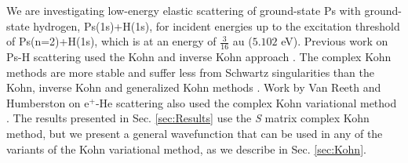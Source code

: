 \documentclass[preprint,showpacs,showkeys,preprintnumbers,amsmath,amssymb,longbibliography,pra,aps]{revtex4-1}
\begin{document}
We are investigating low-energy elastic scattering of ground-state Ps
with ground-state 
hydrogen, Ps(1s)+H(1s), for incident energies up to the excitation threshold 
of Ps(n=2)+H(1s), which is at an energy of $\tfrac{3}{16}$ au ($5.102$ eV). 
Previous work on Ps-H scattering used the Kohn and inverse Kohn approach
\cite{VanReeth2003, VanReeth2004}. The complex Kohn methods are more stable and
suffer less from Schwartz singularities than the Kohn, inverse Kohn and 
generalized Kohn methods \cite{Lucchese1989,Cooper2009,Cooper2010}. Work by 
Van Reeth and Humberston on e$^+$-He scattering also used the complex Kohn 
variational method \cite{VanReeth1999}. The results presented in Sec.
\ref{sec:Results} use the \emph{S} matrix complex Kohn method, but we present a
general wavefunction that can be used in any of the variants of the Kohn 
variational method, as we describe in Sec. \ref{sec:Kohn}.
\end{document}
